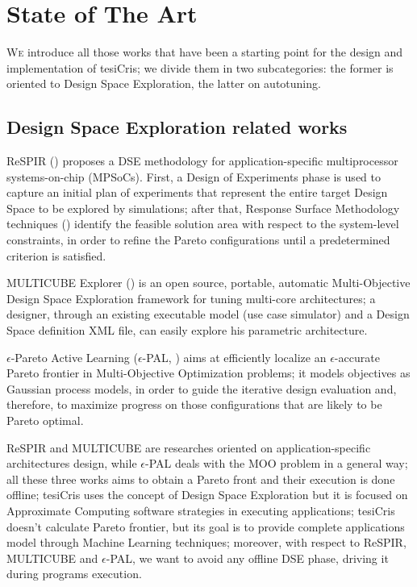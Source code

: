\chapter{State of The Art}\label{sota}

\lettrine{W}{e} introduce all those works that have been a starting point for the design and implementation of tesiCris; we divide them in two subcategories: the former is oriented to Design Space Exploration, the latter on autotuning.

\section{Design Space Exploration related works}

ReSPIR (\cite{palermo2009respir}) proposes a DSE methodology for application-specific multiprocessor systems-on-chip (MPSoCs). First, a Design of Experiments phase is used to capture an initial plan of experiments that represent the entire target Design Space to be explored by simulations; after that, Response Surface Methodology techniques (\cite{khuri2010response}) identify the feasible solution area with respect to the system-level constraints, in order to refine the Pareto configurations until a predetermined criterion is satisfied.

MULTICUBE Explorer (\cite{silvano2011multicube}) is an open source, portable, automatic Multi-Objective Design Space Exploration framework for tuning multi-core architectures; a designer, through an existing executable model (use case simulator) and a Design Space definition XML file, can easily explore his parametric architecture.

$\epsilon$-Pareto Active Learning ($\epsilon$-PAL, \cite{zuluaga2016e}) aims at efficiently localize an $\epsilon$-accurate Pareto frontier in Multi-Objective Optimization problems; it models objectives as Gaussian process models, in order to guide the iterative design evaluation and, therefore, to maximize progress on those configurations that are likely to be Pareto optimal.

ReSPIR and MULTICUBE are researches oriented on application-specific architectures design, while $\epsilon$-PAL deals with the MOO problem in a general way; all these three works aims to obtain a Pareto front and their execution is done offline; tesiCris uses the concept of Design Space Exploration but it is focused on Approximate Computing software strategies in executing applications; tesiCris doesn't calculate Pareto frontier, but its goal is to provide complete applications model through Machine Learning techniques; moreover, with respect to ReSPIR, MULTICUBE and $\epsilon$-PAL, we want to avoid any offline DSE phase, driving it during programs execution.


